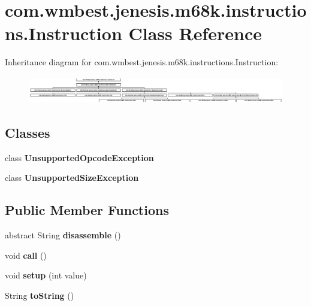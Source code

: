 \hypertarget{classcom_1_1wmbest_1_1jenesis_1_1m68k_1_1instructions_1_1Instruction}{\section{com.\-wmbest.\-jenesis.\-m68k.\-instructions.\-Instruction Class Reference}
\label{classcom_1_1wmbest_1_1jenesis_1_1m68k_1_1instructions_1_1Instruction}
}
Inheritance diagram for com.\-wmbest.\-jenesis.\-m68k.\-instructions.\-Instruction\-:\begin{figure}[H]
\begin{center}
\leavevmode
\includegraphics[height=1.193521cm]{classcom_1_1wmbest_1_1jenesis_1_1m68k_1_1instructions_1_1Instruction}
\end{center}
\end{figure}
\subsection*{Classes}
\begin{DoxyCompactItemize}
\item 
class {\bfseries Unsupported\-Opcode\-Exception}
\item 
class {\bfseries Unsupported\-Size\-Exception}
\end{DoxyCompactItemize}
\subsection*{Public Member Functions}
\begin{DoxyCompactItemize}
\item 
\hypertarget{classcom_1_1wmbest_1_1jenesis_1_1m68k_1_1instructions_1_1Instruction_a7677c16fca3ae713561735023c516619}{abstract String {\bfseries disassemble} ()}\label{classcom_1_1wmbest_1_1jenesis_1_1m68k_1_1instructions_1_1Instruction_a7677c16fca3ae713561735023c516619}

\item 
\hypertarget{classcom_1_1wmbest_1_1jenesis_1_1m68k_1_1instructions_1_1Instruction_a959e9eac7eb4f16d24289ac45b135a86}{void {\bfseries call} ()}\label{classcom_1_1wmbest_1_1jenesis_1_1m68k_1_1instructions_1_1Instruction_a959e9eac7eb4f16d24289ac45b135a86}

\item 
\hypertarget{classcom_1_1wmbest_1_1jenesis_1_1m68k_1_1instructions_1_1Instruction_ad4e0dcee77ed7094ac338d7b8aae43d6}{void {\bfseries setup} (int value)}\label{classcom_1_1wmbest_1_1jenesis_1_1m68k_1_1instructions_1_1Instruction_ad4e0dcee77ed7094ac338d7b8aae43d6}

\item 
\hypertarget{classcom_1_1wmbest_1_1jenesis_1_1m68k_1_1instructions_1_1Instruction_a9c49b686ecae04280f5c6c7e38140896}{String {\bfseries to\-String} ()}\label{classcom_1_1wmbest_1_1jenesis_1_1m68k_1_1instructions_1_1Instruction_a9c49b686ecae04280f5c6c7e38140896}

\end{DoxyCompactItemize}

